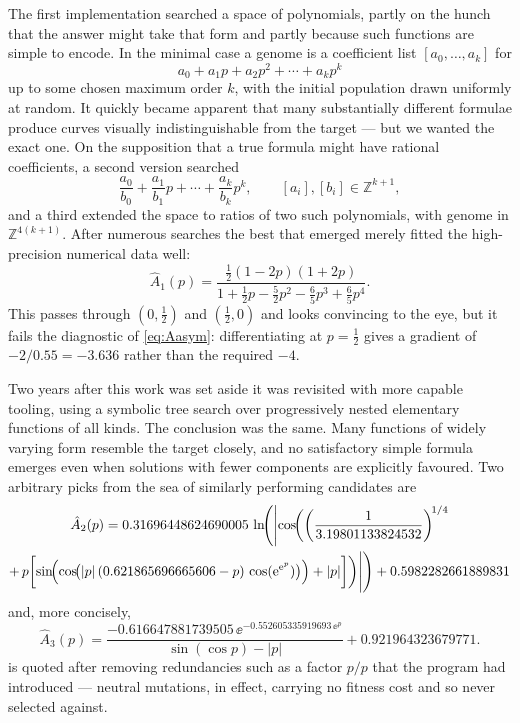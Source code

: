 The first implementation searched a space of polynomials, partly on the hunch that the
answer might take that form and partly because such functions are simple to encode. In the
minimal case a genome is a coefficient list $[a_0,\dots,a_k]$ for
\begin{equation*}
a_0 + a_1p + a_2p^2 + \cdots + a_kp^k
\end{equation*}
up to some chosen maximum order $k$, with the initial population drawn uniformly at
random. It quickly became apparent that many substantially different formulae produce
curves visually indistinguishable from the target --- but we wanted the exact one. On the
supposition that a true formula might have rational coefficients, a second version
searched
\begin{equation*}
\frac{a_0}{b_0} + \frac{a_1}{b_1}p + \cdots + \frac{a_k}{b_k}p^k,
\qquad [a_i],[b_i]\in\mathbb{Z}^{k+1},
\end{equation*}
and a third extended the space to ratios of two such polynomials, with genome in
$\mathbb{Z}^{4(k+1)}$. After numerous searches the best that emerged merely fitted the
high-precision numerical data well:
\begin{equation}
\label{eq:A1hat}
\hat A_1(p) = \frac{\tfrac12(1-2p)(1+2p)}
                   {1 + \tfrac12 p - \tfrac52 p^2 - \tfrac65 p^3 + \tfrac65 p^4} .
\end{equation}
This passes through $(0,\tfrac12)$ and $(\tfrac12,0)$ and looks convincing to the eye, but
it fails the diagnostic of \cref{eq:Aasym}: differentiating at $p=\tfrac12$ gives a
gradient of $-2/0.55 = -3.636$ rather than the required $-4$.

Two years after this work was set aside it was revisited with more capable tooling, using
a symbolic tree search over progressively nested elementary functions of all kinds. The
conclusion was the same. Many functions of widely varying form resemble the target
closely, and no satisfactory simple formula emerges even when solutions with fewer
components are explicitly favoured. Two arbitrary picks from the sea of similarly
performing candidates are
\begin{multline}
\label{eq:A2hat}
\hat A_2(p) = 0.31696448624690005\,
\ln\!\Biggl(\Biggl|\cos\!\biggl(\left(\frac{1}{3.19801133824532}\right)^{\!1/4}\\
+\, p\biggl[\sin\!\Bigl(\cos\!\bigl(|p|\,(0.621865696665606 - p)\,\cos({\rm e}^{{\rm e}^{p}})\bigr)\Bigr) + |p|\biggr]\biggr)\Biggr|\Biggr)
+ 0.5982282661889831
\end{multline}
and, more concisely,
\begin{equation}
\label{eq:A3hat}
\hat A_3(p) = \frac{-0.616647881739505\,\ee^{-0.552605335919693\,\ee^{p}}}
                   {\sin(\cos p) - |p|} + 0.921964323679771 .
\end{equation}
 is quoted after removing redundancies such as a factor $p/p$ that the
program had introduced --- neutral mutations, in effect, carrying no fitness cost and so
never selected against.

